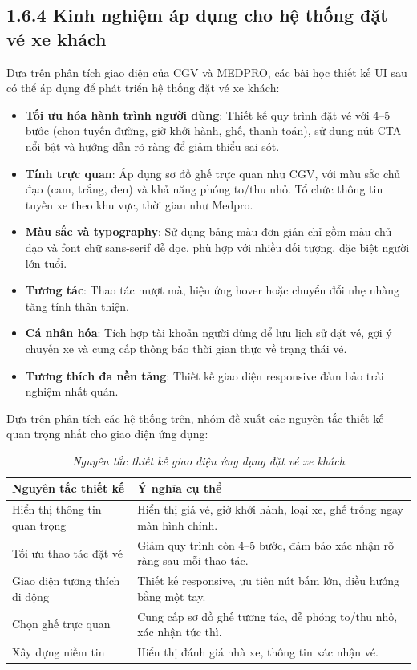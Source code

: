 \subsection*{1.6.4 Kinh nghiệm áp dụng cho hệ thống đặt vé xe khách}
Dựa trên phân tích giao diện của CGV và MEDPRO, các bài học thiết kế UI sau có thể áp dụng để phát triển hệ thống đặt vé xe khách:
\begin{itemize}
    \item \textbf{Tối ưu hóa hành trình người dùng}: Thiết kế quy trình đặt vé với 4--5 bước (chọn tuyến đường, giờ khởi hành, ghế, thanh toán), sử dụng nút CTA nổi bật và hướng dẫn rõ ràng để giảm thiểu sai sót.
    \item \textbf{Tính trực quan}: Áp dụng sơ đồ ghế trực quan như CGV, với màu sắc chủ đạo (cam, trắng, đen) và khả năng phóng to/thu nhỏ. Tổ chức thông tin tuyến xe theo khu vực, thời gian như Medpro.
    \item \textbf{Màu sắc và typography}: Sử dụng bảng màu đơn giản chỉ gồm màu chủ đạo và font chữ sans-serif dễ đọc, phù hợp với nhiều đối tượng, đặc biệt người lớn tuổi.
    \item \textbf{Tương tác}: Thao tác mượt mà, hiệu ứng hover hoặc chuyển đổi nhẹ nhàng tăng tính thân thiện.
    \item \textbf{Cá nhân hóa}: Tích hợp tài khoản người dùng để lưu lịch sử đặt vé, gợi ý chuyến xe và cung cấp thông báo thời gian thực về trạng thái vé.
    \item \textbf{Tương thích đa nền tảng}: Thiết kế giao diện responsive đảm bảo trải nghiệm nhất quán.
\end{itemize}



\noindent Dựa trên phân tích các hệ thống trên, nhóm đề xuất các nguyên tắc thiết kế quan trọng nhất cho giao diện ứng dụng:

\begin{table}[h]
\centering
\begin{tabular}{|p{4.5cm}|p{8.5cm}|}
\hline
\textbf{Nguyên tắc thiết kế} & \textbf{Ý nghĩa cụ thể} \\
\hline
Hiển thị thông tin quan trọng & Hiển thị giá vé, giờ khởi hành, loại xe, ghế trống ngay màn hình chính. \\
\hline
Tối ưu thao tác đặt vé & Giảm quy trình còn 4--5 bước, đảm bảo xác nhận rõ ràng sau mỗi thao tác. \\
\hline
Giao diện tương thích di động & Thiết kế responsive, ưu tiên nút bấm lớn, điều hướng bằng một tay. \\
\hline
Chọn ghế trực quan & Cung cấp sơ đồ ghế tương tác, dễ phóng to/thu nhỏ, xác nhận tức thì. \\
\hline
Xây dựng niềm tin & Hiển thị đánh giá nhà xe, thông tin xác nhận vé. \\
\hline
\end{tabular}
\caption{\textit{Nguyên tắc thiết kế giao diện ứng dụng đặt vé xe khách}}
\label{table3}
\end{table}

